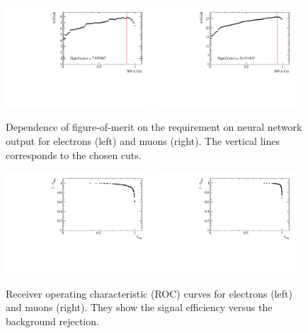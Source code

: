 \begin{figure}
\centering
\includegraphics[width=0.48\textwidth]{RKst/figs/Training/EE_FoM.pdf}
\includegraphics[width=0.48\textwidth]{RKst/figs/Training/MM_FoM.pdf}
\caption{Dependence of figure-of-merit on the requirement on neural network output
for electrons (left) and muons (right). The vertical lines corresponds to the chosen cuts.}
\label{fig:RKst_FOM}
\end{figure}
%
\begin{figure}
\centering
\includegraphics[width=0.48\textwidth]{RKst/figs/Training/EE_ROC.pdf}
\includegraphics[width=0.48\textwidth]{RKst/figs/Training/MM_ROC.pdf}
\caption{Receiver operating characteristic (ROC) curves for electrons (left) and muons (right).
They show the signal efficiency versus the background rejection.}
\label{fig:RKst_ROC}
\end{figure}


